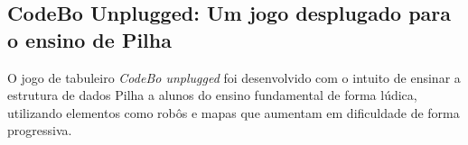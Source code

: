 \subsection{CodeBo Unplugged: Um jogo desplugado para o ensino de Pilha}

O jogo de tabuleiro \emph{CodeBo unplugged} foi desenvolvido com o intuito de ensinar a estrutura de dados Pilha a alunos do ensino fundamental de forma lúdica, utilizando elementos como robôs e mapas que aumentam em dificuldade de forma progressiva. \cite{de2023codebo}


